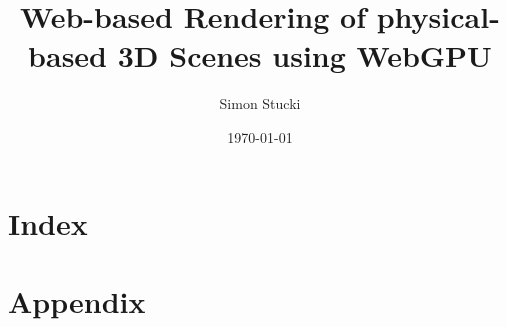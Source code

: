 \documentclass[a4paper, 11pt,abstract=on, listof=totocnumbered]{scrreprt}
\title{Web-based Rendering of physical-based 3D Scenes using WebGPU}
\author{Simon Stucki}
\date{\today}
\begin{document}
% 

\clearpage
\setcounter{page}{1}


\begin{abstract}

\end{abstract}

%

%

\renewcommand{\contentsname}{Contents}
\tableofcontents

%

%

%

%

%

\chapter{Index}


\appendix
\chapter{Appendix}
\label{ch:appendix}
%
\end{document}

